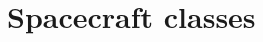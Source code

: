 \documentclass[Orbiter User Manual.tex]{subfiles}
\begin{document}
\section{Spacecraft classes}

\end{document}
